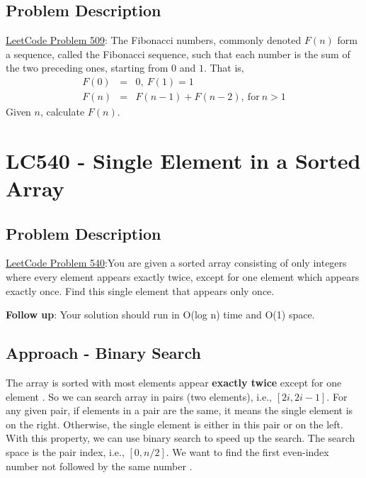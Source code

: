 \documentclass[justified]{tufte-book}
\begin{document}
\subsection{Problem Description}
\href{https://leetcode.com/problems/fibonacci-number/}{LeetCode Problem 509}: The Fibonacci numbers, commonly denoted $F(n)$ form a sequence, called the Fibonacci sequence, such that each number is the sum of the two preceding ones, starting from $0$ and $1$. That is,
\begin{eqnarray*}
    F(0) &=& 0,~ F(1) = 1 \\
    F(n) &=& F(n-1) + F(n-2), ~ \text{for}~ n > 1
\end{eqnarray*}
Given $n$, calculate $F(n)$.

\section{LC540 - Single Element in a Sorted Array} \label{sec:lc540_single_element_sorted_array}
\subsection{Problem Description}
\href{https://leetcode.com/problems/single-element-in-a-sorted-array/}{LeetCode Problem 540}:You are given a sorted array consisting of only integers where every element appears exactly twice, except for one element which appears exactly once. Find this single element that appears only once.

\textbf{Follow up}: Your solution should run in O(log n) time and O(1) space.

\subsection{Approach - Binary Search}
The array is sorted with most elements appear \textbf{exactly twice} except for one element . So we can search array in pairs (two elements), i.e., $[2i, 2i-1]$. For any given pair, if elements in a pair are the same, it means the single element is on the right. Otherwise, the single element is either in this pair or on the left. With this property, we can use binary search to speed up the search. The search space is the pair index, i.e., $[0, n/2]$. We want to find the first even-index number not followed by the same number .
\end{document}
